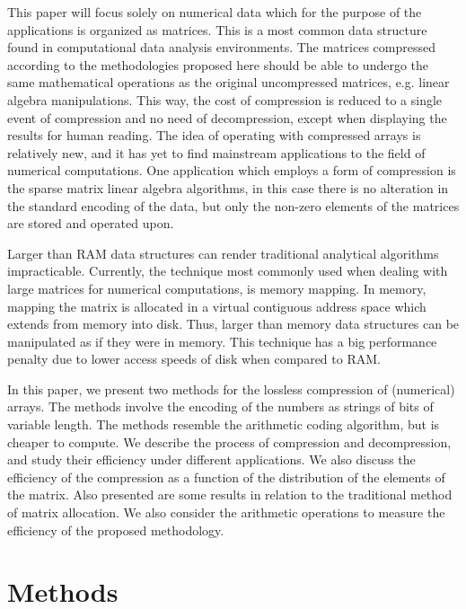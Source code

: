 \documentclass[10pt]{article}
\begin{document}
This paper will focus solely on numerical data which for the purpose of the 
applications is organized as matrices. This is a most common data structure 
found in computational data analysis environments. The matrices compressed 
according to the methodologies proposed here should be able to undergo the same 
mathematical operations as the original uncompressed matrices, e.g. linear 
algebra manipulations. This way, the cost of compression is reduced to a single 
event of compression and no need of decompression, except when displaying the 
results for human reading. The idea of operating with compressed arrays is 
relatively new\cite{yemliha2007compiler}, and it has yet to find mainstream 
applications to the field of numerical computations. One application which 
employs a form of compression is the sparse matrix linear algebra 
algorithms\cite{dodson1991sparse}, in this case there is no alteration in the 
standard encoding of the data, but only the non-zero elements of the matrices 
are stored and operated upon. 

Larger than RAM data structures can render traditional analytical algorithms 
impracticable. Currently, the technique most commonly used when dealing with 
large matrices for numerical computations, is memory 
mapping\cite{van2011numpy,big}. In memory, mapping the matrix is allocated in a 
virtual contiguous address space which extends from memory into disk. Thus, 
larger than memory data structures can be manipulated as if they were in memory. 
This technique has a big performance penalty due to lower access speeds of disk 
when compared to RAM. 

In this paper, we present two methods for the lossless compression of 
(numerical) arrays. The methods involve the encoding of the numbers as strings 
of bits of variable length. The methods resemble the arithmetic 
coding\cite{bodden2007arithmetic} algorithm, but is cheaper to compute. We 
describe the process of compression and decompression, and study their 
efficiency under different applications. We also discuss the efficiency of the 
compression as a function of the distribution of the elements of the matrix. 
 Also presented are some results in relation to the 
traditional method of matrix allocation. We also consider the 
arithmetic operations to measure the efficiency of the proposed methodology.

\section*{Methods}
\end{document}
